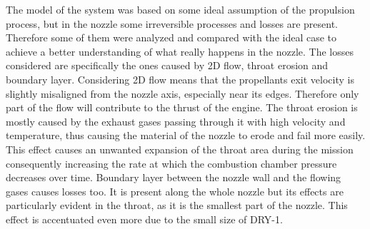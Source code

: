 The model of the system was based on some ideal assumption of the propulsion process, but in the nozzle some irreversible processes and losses are present. Therefore some of them were analyzed and compared with the ideal case to achieve a better understanding of what really happens in the nozzle.
The losses considered are specifically the ones caused by 2D flow, throat erosion and boundary layer. Considering 2D flow means that the propellants exit velocity is slightly misaligned from the nozzle axis, especially near its edges.
Therefore only part of the flow will contribute to the thrust of the engine. The throat erosion is mostly caused by the exhaust gases passing through it with high velocity and temperature, thus causing the material of the nozzle to erode and fail more easily.
This effect causes an unwanted expansion of the throat area during the mission consequently increasing the rate at which the combustion chamber pressure decreases over time. Boundary layer between the nozzle wall and the flowing gases causes losses too.
It is present along the whole nozzle but its effects are particularly evident in the throat, as it is the smallest part of the nozzle. This effect is accentuated even more due to the small size of DRY-1.